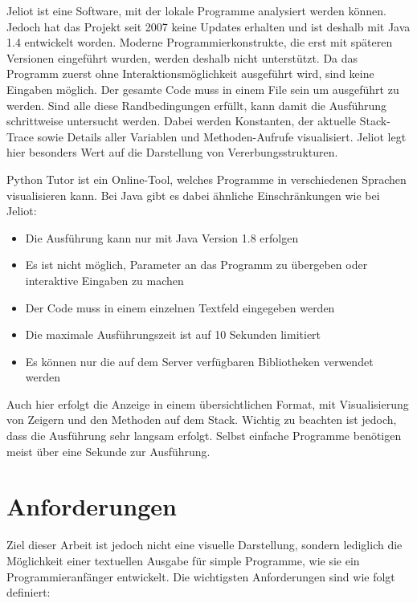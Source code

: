 Jeliot ist eine Software, mit der lokale Programme analysiert werden können. Jedoch hat das Projekt seit 2007 keine Updates erhalten und ist deshalb mit Java 1.4 entwickelt worden. Moderne Programmierkonstrukte, die erst mit späteren Versionen eingeführt wurden, werden deshalb nicht unterstützt. Da das Programm zuerst ohne Interaktionsmöglichkeit ausgeführt wird, sind keine Eingaben möglich. Der gesamte Code muss in einem File sein um ausgeführt zu werden. Sind alle diese Randbedingungen erfüllt, kann damit die Ausführung schrittweise untersucht werden. Dabei werden Konstanten, der aktuelle Stack-Trace sowie Details aller Variablen und Methoden-Aufrufe visualisiert. Jeliot legt hier besonders Wert auf die Darstellung von Vererbungsstrukturen.


Python Tutor ist ein Online-Tool, welches Programme in verschiedenen Sprachen visualisieren kann. Bei Java gibt es dabei ähnliche Einschränkungen wie bei Jeliot:
\begin{itemize}
	\item Die Ausführung kann nur mit Java Version 1.8 erfolgen
	\item Es ist nicht möglich, Parameter an das Programm zu übergeben oder interaktive Eingaben zu machen
	\item Der Code muss in einem einzelnen Textfeld eingegeben werden
	\item Die maximale Ausführungszeit ist auf 10 Sekunden limitiert
	\item Es können nur die auf dem Server verfügbaren Bibliotheken verwendet werden
\end{itemize}

Auch hier erfolgt die Anzeige in einem übersichtlichen Format, mit Visualisierung von Zeigern und den Methoden auf dem Stack. Wichtig zu beachten ist jedoch, dass die Ausführung sehr langsam erfolgt. Selbst einfache Programme benötigen meist über eine Sekunde zur Ausführung.


\section{Anforderungen} 
\label{sec:anforderungen}

Ziel dieser Arbeit ist jedoch nicht eine visuelle Darstellung, sondern lediglich die Möglichkeit einer textuellen Ausgabe für simple Programme, wie sie ein Programmieranfänger entwickelt. Die wichtigsten Anforderungen sind wie folgt definiert:

